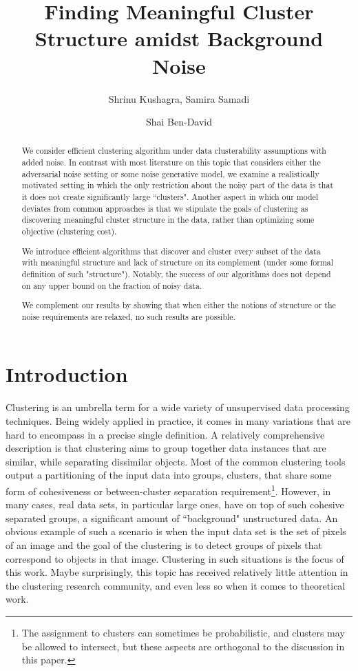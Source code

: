 \documentclass[orivec]{llncs}
\title{Finding Meaningful Cluster Structure amidst Background Noise}
\author{Shrinu Kushagra\inst{1}, Samira Samadi\inst{2} \and Shai Ben-David\inst{1}}
\institute{University of Waterloo, Canada \\ \email{\{skushagr@,shai@cs.\}uwaterloo.ca} \and Georgia Institute of Technology, USA \\ \email{ssamadi6@gatech.edu}}
\begin{document}
\maketitle

\begin{abstract}

We consider efficient clustering algorithm under data clusterability assumptions with added noise. In contrast with most literature on this topic that considers either the adversarial noise setting
or some noise generative model, we examine a realistically motivated setting in which the only restriction about the noisy part of the data is that it does not
create significantly large ``clusters". Another aspect in which our model deviates from common approaches is that we stipulate the goals of clustering as discovering meaningful cluster structure in the data, rather than optimizing some objective (clustering cost).

We introduce efficient algorithms that discover and cluster every subset of the data with meaningful structure and lack of structure on its complement (under some formal definition of such "structure"). Notably, the success of our algorithms does not depend on any upper bound on the fraction of noisy data.

We complement our results by showing that when either the notions of structure or the noise requirements are relaxed, no such results are possible.
\end{abstract}


\section{Introduction}
\label{sec:intro}
Clustering is an umbrella term for a wide variety of unsupervised data processing techniques. Being widely applied in practice, it comes in many variations that are hard to encompass in a precise single definition. A relatively comprehensive description is  that clustering aims to group together data instances that are similar, while separating dissimilar objects. Most of the common clustering tools output a partitioning of the input data into groups, clusters, that share some form of cohesiveness or between-cluster separation requirement\footnote{The assignment to clusters can sometimes be probabilistic, and clusters may be allowed to intersect, but these aspects are orthogonal to the discussion in this paper.}. However, in many cases, real data sets, in particular large ones, have on top of such cohesive separated groups, a significant amount of ``background" unstructured data. An obvious example of such a scenario is when the input data set is the set of pixels of an image and the goal of the clustering is to detect groups of pixels that correspond to objects in that image. Clustering in such situations is the focus of this work. Maybe surprisingly, this topic has received relatively little attention in the clustering research community, and even less so when it comes to theoretical work. 
\end{document}
